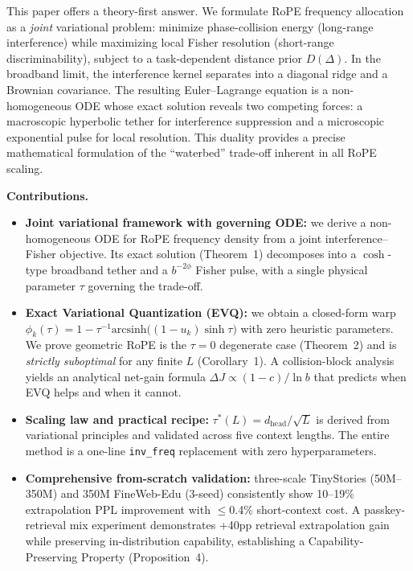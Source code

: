\documentclass{article}
\newcommand{\asinh}{\mathrm{arcsinh}}
\begin{document}
This paper offers a theory-first answer. We formulate RoPE frequency allocation as a \emph{joint} variational problem: minimize phase-collision energy (long-range interference) while maximizing local Fisher resolution (short-range discriminability), subject to a task-dependent distance prior $D(\Delta)$. In the broadband limit, the interference kernel separates into a diagonal ridge and a Brownian covariance. The resulting Euler--Lagrange equation is a non-homogeneous ODE whose exact solution reveals two competing forces: a macroscopic hyperbolic tether for interference suppression and a microscopic exponential pulse for local resolution. This duality provides a precise mathematical formulation of the ``waterbed'' trade-off inherent in all RoPE scaling.

\textbf{Contributions.}
\begin{itemize}
  \item \textbf{Joint variational framework with governing ODE:} we derive a non-homogeneous ODE for RoPE frequency density from a joint interference--Fisher objective. Its exact solution (Theorem~1) decomposes into a $\cosh$-type broadband tether and a $b^{-2\phi}$ Fisher pulse, with a single physical parameter $\tau$ governing the trade-off.
  \item \textbf{Exact Variational Quantization (EVQ):} we obtain a closed-form warp $\phi_k(\tau)\!=\!1\!-\!\tau^{-1}\asinh\bigl((1\!-\!u_k)\sinh\tau\bigr)$ with zero heuristic parameters. We prove geometric RoPE is the $\tau\!=\!0$ degenerate case (Theorem~2) and is \emph{strictly suboptimal} for any finite $L$ (Corollary~1). A collision-block analysis yields an analytical net-gain formula $\Delta J \propto (1-c)/\ln b$ that predicts when EVQ helps and when it cannot.
  \item \textbf{Scaling law and practical recipe:} $\tau^*(L)=d_{\mathrm{head}}/\sqrt{L}$ is derived from variational principles and validated across five context lengths. The entire method is a one-line \texttt{inv\_freq} replacement with zero hyperparameters.
  \item \textbf{Comprehensive from-scratch validation:} three-scale TinyStories (50M--350M) and 350M FineWeb-Edu (3-seed) consistently show 10--19\% extrapolation PPL improvement with $\le$0.4\% short-context cost. A passkey-retrieval mix experiment demonstrates +40pp retrieval extrapolation gain while preserving in-distribution capability, establishing a Capability-Preserving Property (Proposition~4).
\end{itemize}
\end{document}

